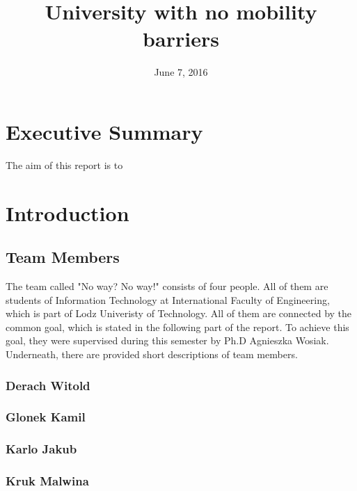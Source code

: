 \documentclass[12pt]{article}
\begin{document}
\begin{titlepage}
\title{University with no mobility barriers}
\date {June 7, 2016}
\maketitle
{}
\end{titlepage}


\section*{Executive Summary}
The aim of this report is to
\cleardoublepage

\tableofcontents
\thispagestyle{empty}

\newpage

\setcounter{page}{2}
\section{Introduction}
\subsection{Team Members}
The team called "No way? No way!" consists of four people. All of them are students of Information Technology at International Faculty of Engineering, which is part of Lodz Univeristy of Technology.
All of them are connected by the common goal, which is stated in the following part of the report. To achieve this goal, they were supervised during this semester by Ph.D Agnieszka Wosiak. Underneath, there are provided short descriptions of team members.
\subsubsection{Derach Witold}

\subsubsection{Glonek Kamil}

\subsubsection{Karlo Jakub}

\subsubsection{Kruk Malwina}
\end{document}
